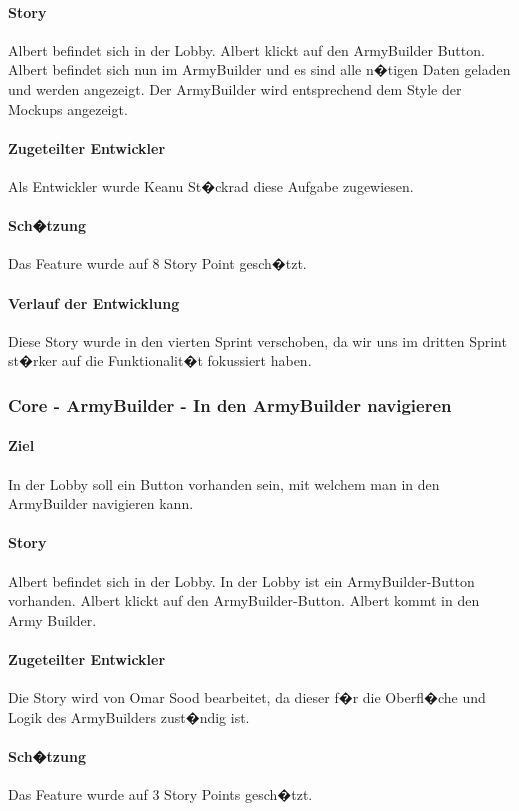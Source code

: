 \documentclass[12pt, titlepage]{scrartcl}
\begin{document}
		\paragraph{Story} Albert befindet sich in der Lobby. Albert klickt auf den ArmyBuilder Button. Albert befindet sich nun im ArmyBuilder und es sind alle n�tigen Daten geladen und werden angezeigt. Der ArmyBuilder wird entsprechend dem Style der Mockups angezeigt.
		\paragraph{Zugeteilter Entwickler} Als Entwickler wurde Keanu St�ckrad diese Aufgabe zugewiesen.
		\paragraph{Sch�tzung}
		Das Feature wurde auf 8 Story Point gesch�tzt.
		\paragraph{Verlauf der Entwicklung} 
		Diese Story wurde in den vierten Sprint verschoben, da wir uns im dritten Sprint st�rker auf die Funktionalit�t fokussiert haben. 
		
		\subsubsection{Core - ArmyBuilder - In den ArmyBuilder navigieren}
		\paragraph{Ziel} In der Lobby soll ein Button vorhanden sein, mit welchem man in den ArmyBuilder navigieren kann.
		\paragraph{Story} Albert befindet sich in der Lobby. In der Lobby ist ein ArmyBuilder-Button vorhanden. Albert klickt auf den ArmyBuilder-Button. Albert kommt in den Army Builder.
		\paragraph{Zugeteilter Entwickler} Die Story wird von Omar Sood bearbeitet, da dieser f�r die Oberfl�che und Logik des ArmyBuilders zust�ndig ist.
		\paragraph{Sch�tzung}
		Das Feature wurde auf 3 Story Points gesch�tzt.
\end{document}
